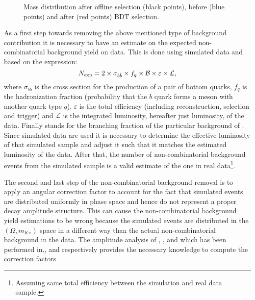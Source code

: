 \begin{figure}[!t]
  \centering
  \scalebox{1}{}
  \caption{Mass distribution after offline selection (black points), before (blue points) and after (red points) BDT selection.}
  \label{mass_BDTG_selection}
\end{figure}

As a first step towards removing the above mentioned type of background contribution it is necessary to have an estimate
on the expected non-combinatorial background yield on data. This is done using simulated data and based on the expression:
\begin{equation}
N_{\rm exp} = 2 \times \sigma_{b\bar{b}}\times f_q \times {\ensuremath{\cal B}} \times \varepsilon \times {\mathcal{L}},
\end{equation}
\noindent where $\sigma_{b\bar{b}}$ is the cross section for the production of a pair of bottom quarks, $f_q$ is the hadronization fraction
(probability that the $b$ quark forms a meson with another quark type $q$), $\varepsilon$ is the total efficiency (including reconstruction,
selection and trigger) and ${\mathcal{L}}$ is the integrated luminosity, hereafter just luminosity, of the data. Finally \BR stands for the
branching fraction of the particular background of . Since simulated data are used it is necessary to determine
the effective luminosity of that simulated sample and adjust it such that it matches the estimated luminosity of the data. After that, the
number of non-combinatorial background events from the simulated sample is a valid estimate of the one in real
data\footnote{Assuming same total efficiency between the simulation and real data sample.}.

The second and last step of the non-combinatorial background removal is to apply an angular correction factor to account for the fact that
simulated events are distributed uniformly in phase space and hence do not represent a proper decay amplitude structure.
This can cause the non-combinatorial background yield estimations to be wrong because the simulated events are distributed in the $(\Omega, m_{K\pi})$ space
in a different way than the actual non-combinatorial background in the data. The amplitude analysis of \BdJpsipipi, \BsJpsipipi, \BsJpsiKK and \LbJpsipK
which has been performed in\cite{SheldonBdpipi},\cite{SheldonBspipi},\cite{SheldonKK} and\cite{Gao:1701984} respectively provides
the necessary knowledge to compute the correction factors

